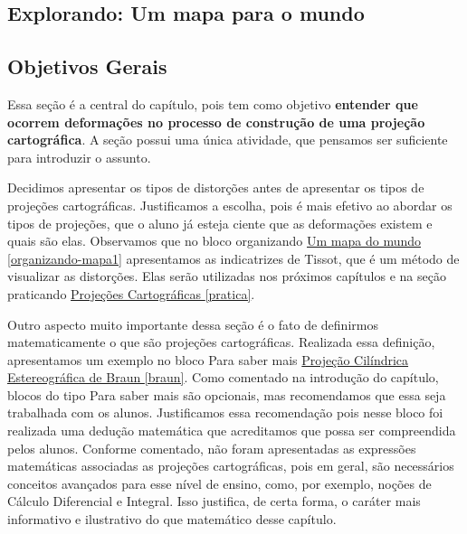 \def\currentcolor{session1}
\begin{texto}
{
\section{Explorando: Um mapa para o mundo}

\subsection{Objetivos Gerais}

Essa seção é a central do capítulo, pois tem como objetivo \textbf{entender que ocorrem deformações no processo de construção de uma projeção cartográfica}. A seção possui uma única atividade, que pensamos ser suficiente para introduzir o assunto. 

Decidimos apresentar os tipos de distorções antes de apresentar os tipos de  projeções cartográficas. Justificamos a escolha, pois é mais efetivo ao abordar os tipos de projeções, que o aluno já esteja ciente que as deformações existem e quais são elas. Observamos que no bloco organizando  \hyperref[organizando-mapa1]{ Um mapa do mundo \ref{organizando-mapa1}} apresentamos as indicatrizes de Tissot, que é um método de visualizar as distorções. Elas serão utilizadas nos próximos capítulos e na seção praticando \hyperref[pratica]{ Projeções Cartográficas \ref{pratica}}.

Outro aspecto muito importante dessa seção é o fato de definirmos matematicamente o que são projeções cartográficas. Realizada essa definição, apresentamos um exemplo no bloco Para saber mais  \hyperref[braun]{ Projeção Cilíndrica Estereográfica de Braun \ref{braun}}. Como comentado na introdução do capítulo, blocos do tipo Para saber mais são opcionais, mas recomendamos que essa seja trabalhada com os alunos. Justificamos essa recomendação pois nesse bloco foi realizada uma  dedução matemática que acreditamos que possa ser compreendida pelos alunos. Conforme comentado, não foram apresentadas as expressões matemáticas associadas as projeções cartográficas, pois em geral, são necessários conceitos avançados para esse nível de ensino, como, por exemplo, noções de Cálculo Diferencial e Integral. Isso justifica, de certa forma, o caráter mais informativo e ilustrativo do que matemático desse capítulo.
}
\end{texto}

